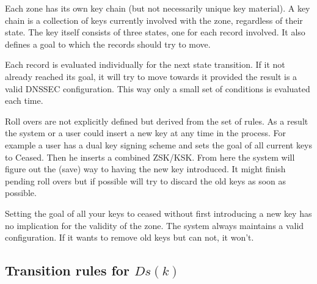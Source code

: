 \documentclass[twoside,english]{article}
\begin{document}
Each zone has its own key chain (but not necessarily unique key 
material). A key chain is a collection of keys currently involved with 
the zone, regardless of their state. The key itself consists of three 
states, one for each record involved. It also defines a goal to which
the records should try to move.

Each record is evaluated individually for the next state transition. 
If it not already reached its goal, it will try to move towards it 
provided the result is a valid DNSSEC configuration. This way only a 
small set of conditions is evaluated each time. 

Roll overs are not explicitly defined but derived from the 
set of rules. As a result the system or a user could insert a new key 
at any time in the process. For example a user has a dual key signing 
scheme and sets the goal of all current keys to Ceased. Then he inserts
a combined ZSK/KSK. From here the system will figure out the (save) way
to having the new key introduced. It might finish pending roll overs 
but if possible will try to discard the old keys as soon as possible.

Setting the goal of all your keys to ceased without first introducing 
a new key has no implication for the validity of the zone. The system 
always maintains a valid configuration. If it wants to remove old keys 
but can not, it won't.


\subsection{Transition rules for $Ds(k)$}

\end{document}
